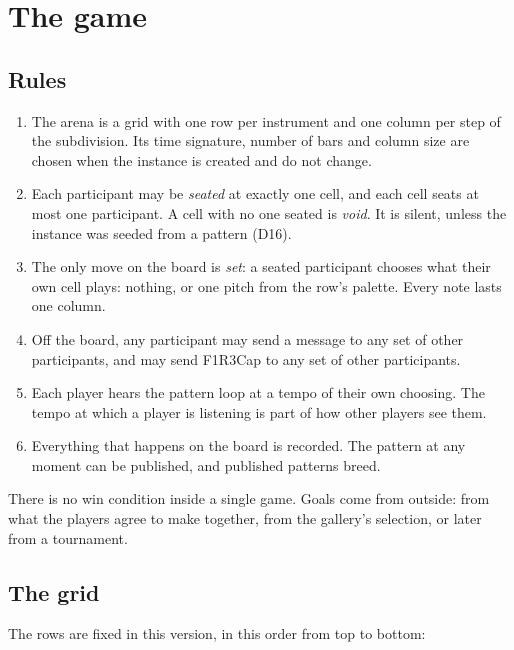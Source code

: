 \documentclass[11pt,a4paper]{article}
\begin{document}
\section{The game}\label{sec:game}

\subsection{Rules}

\begin{enumerate}[leftmargin=1.4em,itemsep=3pt]
\item The arena is a grid with one row per instrument and one column per step of the
  subdivision. Its time signature, number of bars and column size are chosen when the instance
  is created and do not change.
\item Each participant may be \emph{seated} at exactly one cell, and each cell seats at most one
  participant. A cell with no one seated is \emph{void}. It is silent, unless the instance was
  seeded from a pattern (D16).
\item The only move on the board is \emph{set}: a seated participant chooses what their own
  cell plays: nothing, or one pitch from the row's palette. Every note lasts one column.
\item Off the board, any participant may send a message to any set of other participants, and
  may send F1R3Cap to any set of other participants.
\item Each player hears the pattern loop at a tempo of their own choosing. The tempo at which a
  player is listening is part of how other players see them.
\item Everything that happens on the board is recorded. The pattern at any moment can be
  published, and published patterns breed.
\end{enumerate}

There is no win condition inside a single game. Goals come from outside: from what the players
agree to make together, from the gallery's selection, or later from a tournament.

\subsection{The grid}

The rows are fixed in this version, in this order from top to bottom:
\end{document}
